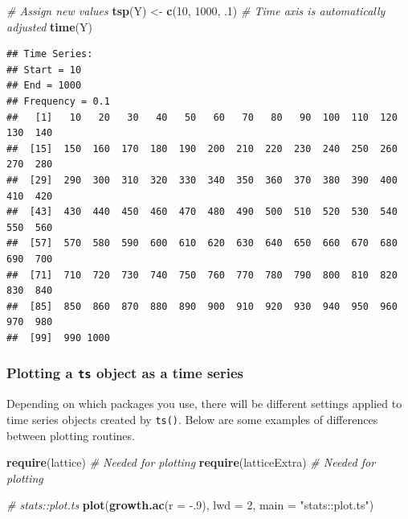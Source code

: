 \documentclass[]{book}
\newenvironment{Shaded}{\begin{snugshade}}{\end{snugshade}}
\newcommand{\KeywordTok}[1]{\textcolor[rgb]{0.13,0.29,0.53}{\textbf{{#1}}}}
\newcommand{\DataTypeTok}[1]{\textcolor[rgb]{0.13,0.29,0.53}{{#1}}}
\newcommand{\DecValTok}[1]{\textcolor[rgb]{0.00,0.00,0.81}{{#1}}}
\newcommand{\StringTok}[1]{\textcolor[rgb]{0.31,0.60,0.02}{{#1}}}
\newcommand{\CommentTok}[1]{\textcolor[rgb]{0.56,0.35,0.01}{\textit{{#1}}}}
\newcommand{\NormalTok}[1]{{#1}}
\begin{document}
\begin{Shaded}
\begin{Highlighting}[]
\CommentTok{# Assign new values}
\KeywordTok{tsp}\NormalTok{(Y) <-}\StringTok{ }\KeywordTok{c}\NormalTok{(}\DecValTok{10}\NormalTok{, }\DecValTok{1000}\NormalTok{, .}\DecValTok{1}\NormalTok{)}
\CommentTok{# Time axis is automatically adjusted }
\KeywordTok{time}\NormalTok{(Y)}
\end{Highlighting}
\end{Shaded}

\begin{verbatim}
## Time Series:
## Start = 10 
## End = 1000 
## Frequency = 0.1 
##   [1]   10   20   30   40   50   60   70   80   90  100  110  120  130  140
##  [15]  150  160  170  180  190  200  210  220  230  240  250  260  270  280
##  [29]  290  300  310  320  330  340  350  360  370  380  390  400  410  420
##  [43]  430  440  450  460  470  480  490  500  510  520  530  540  550  560
##  [57]  570  580  590  600  610  620  630  640  650  660  670  680  690  700
##  [71]  710  720  730  740  750  760  770  780  790  800  810  820  830  840
##  [85]  850  860  870  880  890  900  910  920  930  940  950  960  970  980
##  [99]  990 1000
\end{verbatim}

\subsubsection*{\texorpdfstring{Plotting a \texttt{ts} object as a time
series}{Plotting a ts object as a time series}}\label{plotting-a-ts-object-as-a-time-series}

Depending on which packages you use, there will be different settings
applied to time series objects created by \texttt{ts()}. Below are some
examples of differences between plotting routines.

\begin{Shaded}
\begin{Highlighting}[]
\KeywordTok{require}\NormalTok{(lattice)       }\CommentTok{# Needed for plotting}
\KeywordTok{require}\NormalTok{(latticeExtra)  }\CommentTok{# Needed for plotting}

\CommentTok{# stats::plot.ts}
\KeywordTok{plot}\NormalTok{(}\KeywordTok{growth.ac}\NormalTok{(}\DataTypeTok{r =} \NormalTok{-.}\DecValTok{9}\NormalTok{), }\DataTypeTok{lwd =} \DecValTok{2}\NormalTok{, }\DataTypeTok{main =} \StringTok{"stats::plot.ts"}\NormalTok{)}
\end{Highlighting}
\end{Shaded}
\end{document}
